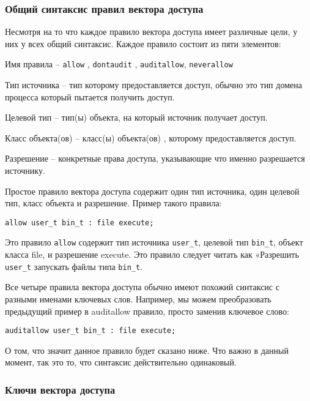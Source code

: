 \documentclass{./../class/UIR}
\begin{document}
\subsubsection{Общий синтаксис правил вектора доступа}
    Несмотря на то что каждое правило вектора доступа имеет различные цели, у них у
    всех общий синтаксис. Каждое правило состоит из пяти элементов:

    \begin{description}
      \item Имя правила – \verb"allow" , \verb"dontaudit" , \verb"auditallow",
      \verb"neverallow"
      \item Тип источника – тип которому предоставляется доступ, обычно это тип
      домена процесса который пытается получить доступ.
      \item Целевой тип – тип(ы) объекта, на который источник получает доступ.
      \item Класс объекта(ов) – класс(ы) объекта(ов) , которому предоставляется
      доступ.
      \item Разрешение – конкретные права доступа, указывающие что именно
      разрешается источнику.
    \end{description}

    Простое правило вектора доступа содержит один тип источника, один целевой тип,
    класс объекта и разрешение. Пример такого правила:
\begin{verbatim}
allow user_t bin_t : file execute;
\end{verbatim}
    Это правило \verb"allow"  содержит тип источника \verb"user_t", целевой тип
    \verb"bin_t", объект класса file, и разрешение execute. Это правило следует
    читать как «Разрешить \verb"user_t" запускать файлы типа \verb"bin_t".

	Все четыре правила вектора доступа обычно имеют похожий синтаксис с разными
	именами ключевых слов. Например, мы можем преобразовать предыдущий пример в
	auditallow правило, просто заменив ключевое слово:
\begin{verbatim}
auditallow user_t bin_t : file execute;
\end{verbatim}
	О том, что значит данное правило будет сказано ниже. Что важно в данный момент,
	так  это то, что синтаксис действительно одинаковый.

\subsubsection{Ключи вектора доступа}
\end{document}
